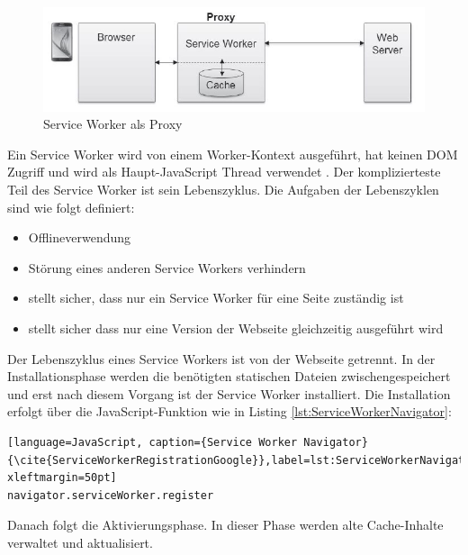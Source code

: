 \begin{figure}[h]
	\centering
	\includegraphics[width=14cm]{BilderAllgemein/SWProxy}\medskip
	\caption{Service Worker als Proxy \cite{SWProxy}}
	\label{fig:SWProxy}
\end{figure}

Ein Service Worker wird von einem Worker-Kontext ausgeführt, hat keinen DOM Zugriff und wird als Haupt-JavaScript Thread verwendet \cite{Worker} \cite{ServiceWorker}.
Der komplizierteste Teil des Service Worker ist sein Lebenszyklus. 
\newpage
Die Aufgaben der Lebenszyklen sind wie folgt definiert:

\begin{itemize}
    \item  Offlineverwendung
	\item  Störung eines anderen Service Workers verhindern
	\item  stellt sicher, dass nur ein Service Worker für eine Seite zuständig ist
	\item  stellt sicher dass nur eine Version der Webseite gleichzeitig ausgeführt wird
\end{itemize}


Der Lebenszyklus eines Service Workers ist von der Webseite getrennt.
In der Installationsphase werden die benötigten statischen Dateien zwischengespeichert und erst nach diesem Vorgang ist der Service Worker installiert. Die Installation erfolgt über die JavaScript-Funktion wie in Listing \ref{lst:ServiceWorkerNavigator}:

\begin{lstlisting}[language=JavaScript, caption={Service Worker Navigator} {\cite{ServiceWorkerRegistrationGoogle}},label=lst:ServiceWorkerNavigator, xleftmargin=50pt]
navigator.serviceWorker.register
\end{lstlisting}

Danach folgt die Aktivierungsphase. In dieser Phase werden alte Cache-Inhalte verwaltet und aktualisiert.




